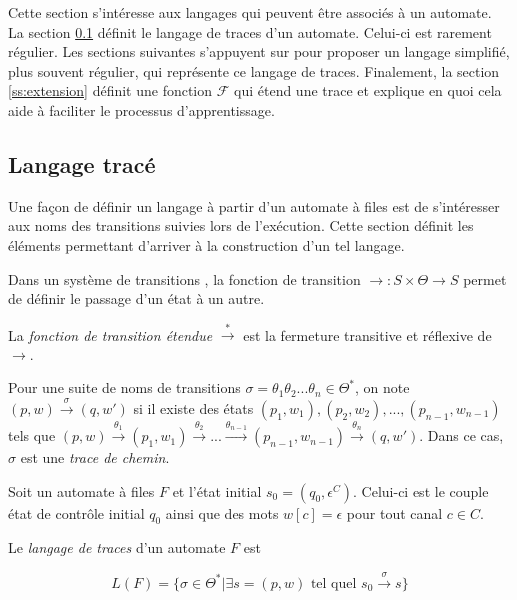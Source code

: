 Cette section s'intéresse aux langages qui peuvent être associés à un automate. La section \ref{ss:trace} définit le langage de traces d'un automate. Celui-ci est rarement régulier. Les sections suivantes s'appuyent sur \cite{Vardhan04} pour proposer un langage simplifié, plus souvent régulier, qui représente ce langage de traces. Finalement, la section \ref{ss:extension} définit une fonction $\mathcal{F}$ qui étend une trace et explique en quoi cela aide à faciliter le processus d'apprentissage. 



\subsection{Langage tracé}\label{ss:trace}

Une façon de définir un langage à partir d'un automate à files est de s'intéresser aux noms des transitions suivies lors de l'exécution. Cette section définit les éléments permettant d'arriver à la construction d'un tel langage.

Dans un système de transitions \tsys, la fonction de transition $\rightarrow:S\times\Theta\rightarrow S$ permet de définir le passage d'un état à un autre.

La \emph{fonction de transition étendue} $\xrightarrow{*}$ est la fermeture transitive et réflexive de $\rightarrow$.

Pour une suite de noms de transitions $\sigma=\theta_1\theta_2 ...\theta_n\in\Theta^*$, on note $(p,w)\xrightarrow{\sigma}(q,w')$ si il existe des états $(p_1,w_1),(p_2,w_2),...,(p_{n-1},w_{n-1})$ tels que $(p,w)\xrightarrow{\theta_1}(p_1,w_1)\xrightarrow{\theta_2}...\xrightarrow{\theta_{n-1}}(p_{n-1},w_{n-1})\xrightarrow{\theta_n}(q,w')$. Dans ce cas, $\sigma$ est une \emph{trace de chemin}.

\begin{definition} Soit un automate à files $F$ et l'état initial $s_0=(q_0, \epsilon^C)$. Celui-ci est le couple état de contrôle initial $q_0$ ainsi que des mots $w[c]=\epsilon$ pour tout canal $c\in C$.

  Le \emph{langage de traces} d'un automate $F$ est

  $$
  L(F)=\{\sigma\in\Theta^*|\exists s=(p,w) \text{ tel quel } s_0\xrightarrow{\sigma}s\}
  $$
\end{definition}

